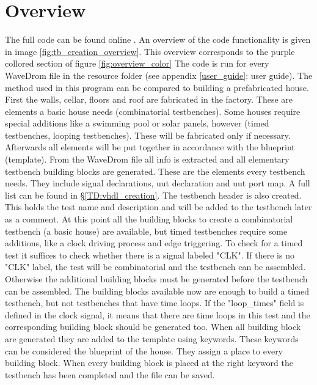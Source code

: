 \section{Overview}
The full code can be found online \cite{github}. An overview of the code functionality is given in image \ref{fig:tb_creation_overview}. This overview corresponds to the purple collored section of figure \ref{fig:overview_color}%
\clearpage\noindent
The code is run for every WaveDrom file in the resource folder (see appendix \ref{user_guide}: user guide). The method used in this program can be compared to building a \mbox{prefabricated} house. First the walls, cellar, floors and roof are fabricated in the factory. These are elements a basic house needs (combinatorial testbenches). Some houses require special additions like a swimming pool or solar panels, however (timed testbenches, looping testbenches). These will be fabricated only if necessary. Afterwards all elements will be put together in accordance with the blueprint (template).
\npar
From the WaveDrom file all info is extracted and all elementary testbench building blocks are generated. These are the elements every testbench needs. They include signal declarations, uut declaration and uut port map. A full list can be found in §\ref{TD:vhdl_creation}. The testbench header is also created. This holds the test name and description and will be added to the testbench later as a comment.
\npar
At this point all the building blocks to create a combinatorial testbench (a basic house) are available, but timed testbenches require some additions, like a clock driving process and edge triggering. To check for a timed test it suffices to check whether there is a signal labeled "CLK". If there is no "CLK" label, the test will be combinatorial and the testbench can be assembled. Otherwise the additional building blocks must be generated before the testbench can be assembled. 
\npar
The building blocks available now are enough to build a timed testbench, but not testbenches that have time loops. If the "loop\_times" field is defined in the clock signal, it means that there are time loops in this test and the corresponding building block should be generated too.
\npar
When all building block are generated they are added to the template using keywords. These keywords can be considered the blueprint of the house. They assign a place to every building block. When every building block is placed at the right keyword the testbench has been completed and the file can be saved.\newpage
